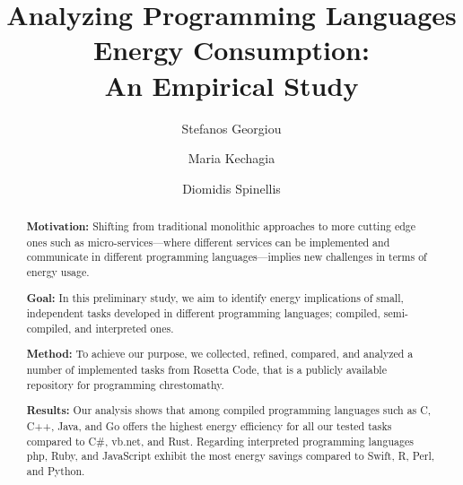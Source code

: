 \documentclass[sigconf]{acmart}
\begin{document}
\title{Analyzing Programming Languages Energy Consumption: \\ An Empirical Study}


\author{Stefanos Georgiou}

\author{Maria Kechagia}

\author{Diomidis Spinellis}


\renewcommand{\shortauthors}{S. Georgiou et al.}


\begin{abstract}
\noindent \textbf{Motivation:} Shifting from traditional 
monolithic approaches to more cutting edge ones such as micro-services---where 
different services can be implemented and communicate in 
different programming languages---implies new challenges in terms 
of energy usage.

\noindent \textbf{Goal:} In this preliminary study, we aim to 
identify energy implications of small, independent tasks developed 
in different programming languages; compiled, semi-compiled, and 
interpreted ones.

\noindent \textbf{Method:} To achieve our purpose, we collected, 
refined, compared, and analyzed a number of implemented tasks from 
Rosetta Code, that is a publicly available repository for programming 
chrestomathy. 

\noindent \textbf{Results:} Our analysis shows that among compiled 
programming languages such as C, C++, Java, and Go offers 
the highest energy efficiency for all our tested tasks compared 
to C\#, {\sc vb.net}, and Rust. 
Regarding interpreted programming languages {\sc php}, Ruby, and JavaScript 
exhibit the most energy savings compared to Swift, R, Perl, and 
Python. 


\end{abstract}
\end{document}
